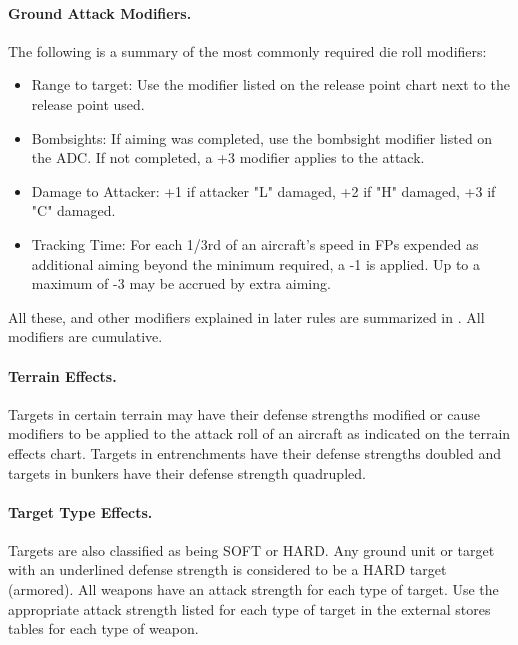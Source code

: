 \paragraph{Ground Attack Modifiers.} The following is a summary of the most commonly required die roll modifiers:
\begin{itemize}
    \item Range to target: Use the modifier listed on the release point chart next to the release point used.
    \item Bombsights: If aiming was completed, use the bombsight modifier listed on the ADC. If not completed, a +3 modifier applies to the attack.
    \item Damage to Attacker: +1 if attacker "L" damaged, +2 if "H" damaged, +3 if "C" damaged.
    \item Tracking Time: For each 1/3rd of an aircraft's speed in FPs expended as additional aiming beyond the minimum required, a -1 is applied. Up to a maximum of -3 may be accrued by extra aiming.
\end{itemize}

All these, and other modifiers explained in later rules are summarized in . All modifiers are cumulative.

\paragraph{Terrain Effects.} Targets in certain terrain may have their defense strengths modified or cause modifiers to be applied to the attack roll of an aircraft as indicated on the terrain effects chart. Targets in entrenchments have their defense strengths doubled and targets in bunkers have their defense strength quadrupled.

\paragraph{Target Type Effects.} Targets are also classified as being SOFT or HARD. Any ground unit or target with an underlined defense strength is considered to be a HARD target (armored). All weapons have an attack strength for each type of target. Use the appropriate attack strength listed for each type of target in the external stores tables for each type of weapon.



